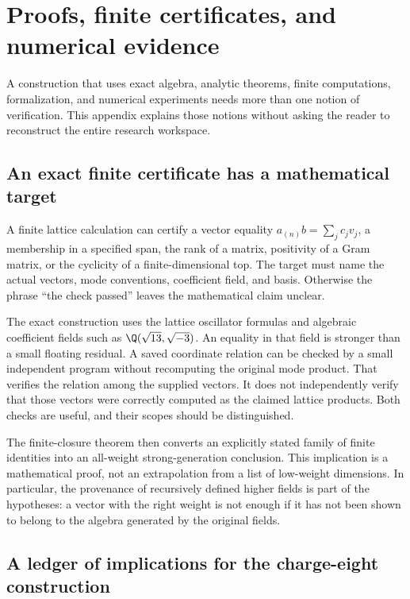 \chapter{Proofs, finite certificates, and numerical evidence}
\label{app:verification}

A construction that uses exact algebra, analytic theorems, finite
computations, formalization, and numerical experiments needs more
than one notion of verification. This appendix explains those
notions without asking the reader to reconstruct the entire
research workspace.

\section{An exact finite certificate has a mathematical target}

A finite lattice calculation can certify a vector equality
$a_{(n)}b=\sum_jc_jv_j$, a membership in a specified span, the
rank of a matrix, positivity of a Gram matrix, or the cyclicity
of a finite-dimensional top. The target must name the actual
vectors, mode conventions, coefficient field, and basis.
Otherwise the phrase ``the check passed'' leaves the mathematical
claim unclear.

The exact construction uses the lattice oscillator formulas and
algebraic coefficient fields such as $\Q(\sqrt{13},\sqrt{-3})$.
An equality in that field is stronger than a small floating
residual. A saved coordinate relation can be checked by a small
independent program without recomputing the original mode product.
That verifies the relation among the supplied vectors. It does
not independently verify that those vectors were correctly
computed as the claimed lattice products. Both checks are useful,
and their scopes should be distinguished.

The finite-closure theorem then converts an explicitly stated
family of finite identities into an all-weight strong-generation
conclusion. This implication is a mathematical proof, not an
extrapolation from a list of low-weight dimensions. In particular,
the provenance of recursively defined higher fields is part of
the hypotheses: a vector with the right weight is not enough if
it has not been shown to belong to the algebra generated by the
original fields.

\section{A ledger of implications for the charge-eight construction}
\label{sec:verification-construction-ledger}

